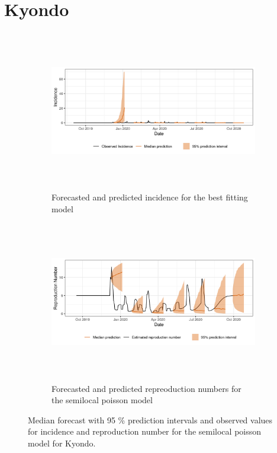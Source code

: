  \section{ Kyondo }\begin{figure}[H]\begin{subfigure}{\textwidth}  \centering  \includegraphics[width=0.9\linewidth, height=7cm]{../output/Kyondo_predictions.png}  \caption{Forecasted and predicted incidence for the best fitting model}\end{subfigure}

\begin{subfigure}{\textwidth}  \centering  \includegraphics[width=0.9\linewidth, height=7cm]{../output/Kyondo_Rs.png}  \caption{Forecasted and predicted repreoduction numbers for the semilocal poisson model}\end{subfigure}  \caption{Median forecast with 95 \% prediction intervals and observed values for incidence and reproduction number for the semilocal poisson model for Kyondo.}\end{figure}

